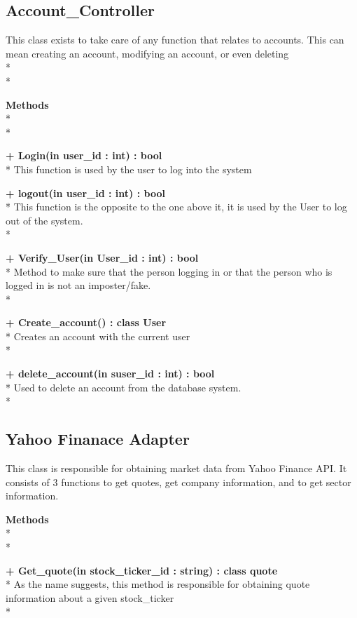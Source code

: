 \subsection{Account_Controller}
This class exists to take care of any function that relates to accounts. This
can mean creating an account, modifying an account, or even deleting
 \\* \\*

{\bfseries Methods} \\* \\*

{\bfseries + Login(in user_id : int) : bool} \\*
	This function is used by the user to log into the system

{\bfseries + logout(in user_id : int) : bool } \\*
	This function is the opposite to the one above it, it is
    used by the User to log out of the system. \\*

{\bfseries + Verify_User(in User_id : int) : bool} \\*
	Method to make sure that the person logging in or that
    the person who is logged in is not an imposter/fake. \\*

{\bfseries + Create_account() : class User } \\*
	Creates an account with the current user  \\*

{\bfseries + delete_account(in suser_id : int) : bool } \\*
	Used to delete an account from the database system.   \\*

\subsection{Yahoo Finanace Adapter}
This class is responsible for obtaining market data from Yahoo Finance
API.  It consists of 3 functions to get quotes, get company information,
and to get sector information.

{\bfseries Methods} \\* \\*

{\bfseries + Get_quote(in stock_ticker_id : string) : class quote } \\*
	As the name suggests, this method is responsible for obtaining
    quote information about a given stock_ticker \\*

